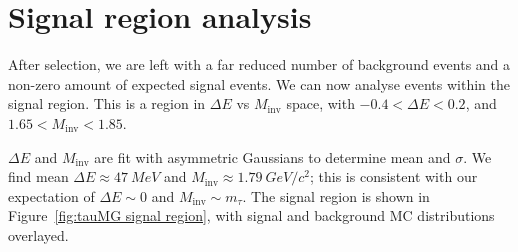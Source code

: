 \documentclass[12pt]{thesis}  %
\begin{document}

\chapter{Signal region analysis}

After selection, we are left with a far reduced number of background events and a non-zero amount of expected signal events. We can now analyse events within the signal region. This is a region in $\Delta E$ vs $M_{\text{inv}}$ space, with $-0.4 < \Delta E < 0.2$, and $1.65 < M_{\text{inv}} < 1.85$.

$\Delta E$ and $M_{\text{inv}}$ are fit with asymmetric Gaussians to determine mean and $\sigma$. We find mean $\Delta E \approx \SI{47}{MeV}$ and $M_{\text{inv}} \approx \SI{1.79}{GeV/c^2}$; this is consistent with our expectation of $\Delta E \sim 0$ and $M_{\text{inv}} \sim m_{\tau}$. The signal region is shown in Figure~\ref{fig:tauMG signal region}, with signal and background MC distributions overlayed. 
\end{document}
